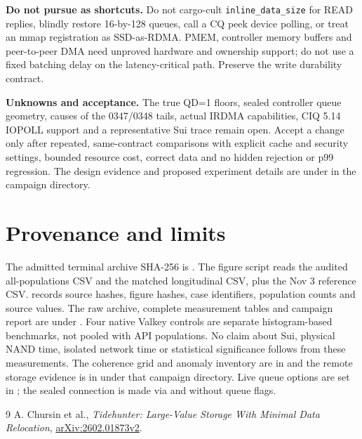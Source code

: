 \documentclass[10pt,a4paper]{article}
\begin{document}
\textbf{Do not pursue as shortcuts.} Do not cargo-cult \texttt{inline\_data\_size} for READ replies, blindly restore 16-by-128 queues, call a CQ peek device polling, or treat an mmap registration as SSD-as-RDMA. PMEM, controller memory buffers and peer-to-peer DMA need unproved hardware and ownership support; do not use a fixed batching delay on the latency-critical path. Preserve the write durability contract.

\textbf{Unknowns and acceptance.} The true QD=1 floors, sealed controller queue geometry, causes of the 0347/0348 tails, actual IRDMA capabilities, CIQ 5.14 IOPOLL support and a representative Sui trace remain open. Accept a change only after repeated, same-contract comparisons with explicit cache and security settings, bounded resource cost, correct data and no hidden rejection or p99 regression. The design evidence and proposed experiment details are under  in the campaign directory.

\section{Provenance and limits}
The admitted terminal archive SHA-256 is . The figure script reads the audited all-populations CSV and the matched longitudinal CSV, plus the Nov 3 reference CSV.  records source hashes, figure hashes, case identifiers, population counts and source values. The raw archive, complete measurement tables and campaign report are under . Four native Valkey controls are separate histogram-based benchmarks, not pooled with API populations. No claim about Sui, physical NAND time, isolated network time or statistical significance follows from these measurements.
The coherence grid and anomaly inventory are in  and the remote storage evidence is in  under that campaign directory. Live queue options are set in ; the sealed connection is made via  and  without queue flags.

\begin{thebibliography}{9}\small
{} A. Chursin et al., \emph{Tidehunter: Large-Value Storage With Minimal Data Relocation}, \href{https://arxiv.org/abs/2602.01873v2}{arXiv:2602.01873v2}.
\end{thebibliography}
\clearpage

\end{document}
